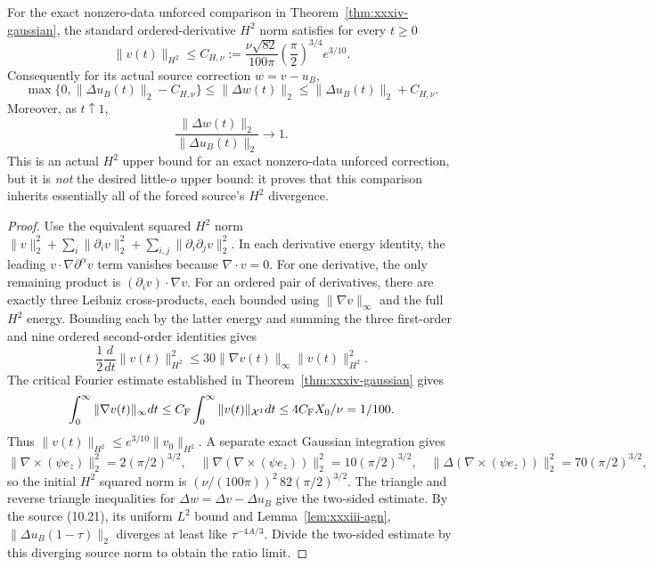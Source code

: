 \begin{proposition}
\label{prop:xxxiv-two-sided}
For the exact nonzero-data unforced comparison in
Theorem~\ref{thm:xxxiv-gaussian}, the standard ordered-derivative
$H^2$ norm satisfies for every $t\ge0$
\[
\boxed{\quad
\|v(t)\|_{H^2}\le
C_{H,\nu}:=
\frac{\nu\sqrt{82}}{100\pi}
\left(\frac\pi2\right)^{3/4}e^{3/10}.\quad}
\]
Consequently for its actual source correction $w=v-u_B$,
\begin{equation}\label{eq:xxxiv-h2-two-sided}
\boxed{\quad
\max\{0,\|\Delta u_B(t)\|_2-C_{H,\nu}\}
\le\|\Delta w(t)\|_2
\le\|\Delta u_B(t)\|_2+C_{H,\nu}.\quad}
\end{equation}
Moreover, as $t\uparrow1$,
\begin{equation}\label{eq:xxxiv-h2-ratio}
\boxed{\quad
\frac{\|\Delta w(t)\|_2}{\|\Delta u_B(t)\|_2}
\longrightarrow1.\quad}
\end{equation}
This is an actual $H^2$ upper bound for an exact nonzero-data
unforced correction, but it is \emph{not} the desired
little-$o$ upper bound: it proves that this comparison
inherits essentially all of the forced source's $H^2$
divergence.
\end{proposition}
\begin{proof}
Use the equivalent squared $H^2$ norm
$\|v\|_2^2+\sum_i\|\partial_iv\|_2^2+
\sum_{i,j}\|\partial_i\partial_jv\|_2^2$.
In each derivative energy identity, the leading
$v\cdot\nabla\partial^\alpha v$ term vanishes because
$\nabla\cdot v=0$.
For one derivative, the only remaining product is
$(\partial_iv)\cdot\nabla v$. For an ordered pair of
derivatives, there are exactly three Leibniz cross-products,
each bounded using
$\|\nabla v\|_\infty$ and the full $H^2$ energy.
Bounding each by the latter energy and summing the three
first-order and nine ordered second-order identities gives
\[
\frac12\frac d{dt}\|v(t)\|_{H^2}^2
\le30\|\nabla v(t)\|_\infty\|v(t)\|_{H^2}^2.
\]
The critical Fourier estimate established in
Theorem~\ref{thm:xxxiv-gaussian} gives
\[
\int_0^\infty\|\nabla v(t)\|_\infty dt
\le C_{\rm F}\int_0^\infty\|v(t)\|_{\mathcal X^1}dt
\le 4C_{\rm F}X_0/\nu=1/100.
\]
Thus $\|v(t)\|_{H^2}\le e^{3/10}\|v_0\|_{H^2}$.
A separate exact Gaussian integration gives
\[
\|\nabla\times(\psi e_z)\|_2^2=
2(\pi/2)^{3/2},\quad
\|\nabla(\nabla\times(\psi e_z))\|_2^2=
10(\pi/2)^{3/2},\quad
\|\Delta(\nabla\times(\psi e_z))\|_2^2=
70(\pi/2)^{3/2},
\]
so the initial $H^2$ squared norm is
$(\nu/(100\pi))^2\,82(\pi/2)^{3/2}$.
The triangle and reverse triangle inequalities for
$\Delta w=\Delta v-\Delta u_B$ give the two-sided estimate.
By the source (10.21), its uniform $L^2$ bound and
Lemma~\ref{lem:xxxiii-agn},
$\|\Delta u_B(1-\tau)\|_2$ diverges at least like
$\tau^{-4A/3}$. Divide the two-sided estimate by this
diverging source norm to obtain the ratio limit.
\end{proof}


